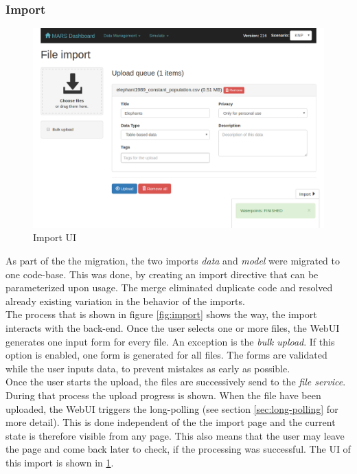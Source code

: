 \subsubsection{Import}
\begin{figure}[H]
	\centering\includegraphics[width=1\textwidth]{res/import-ui}
	\caption{Import UI}
	\label{fig:import-ui}
\end{figure}
As part of the the migration, the two imports \textit{data} and \textit{model} were migrated to one code-base. This was done, by creating an import directive that can be parameterized upon usage. The merge eliminated duplicate code and resolved already existing variation in the behavior of the imports.\\
The process that is shown in figure \ref{fig:import} shows the way, the import interacts with the back-end. Once the user selects one or more files, the WebUI generates one input form for every file. An exception is the \textit{bulk upload}. If this option is enabled, one form is generated for all files. The forms are validated while the user inputs data, to prevent mistakes as early as possible.\\
Once the user starts the upload, the files are successively send to the \textit{file service}. During that process the upload progress is shown. When the file have been uploaded, the WebUI triggers the long-polling (see section \ref{sec:long-polling} for more detail). This is done independent of the the import page and the current state is therefore visible from any page. This also means that the user may leave the page and come back later to check, if the processing was successful. The UI of this import is shown in \ref{fig:import-ui}.

